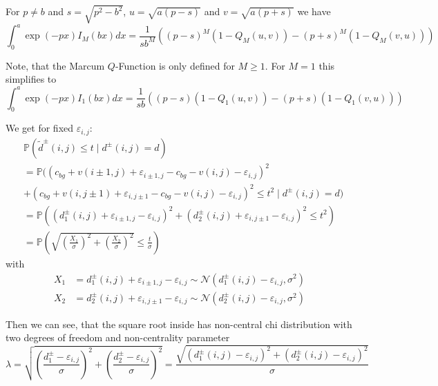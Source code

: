 \documentclass[a4paper,12pt]{article}
\theoremstyle{plain}
\theoremstyle{definition}
\theoremstyle{remark}
\begin{document}
	For $p \neq b$ and $s = \sqrt{p^2 - b^2}$, $u = \sqrt{a (p - s)}$ and $v = \sqrt{a (p + s)}$ we have
	\begin{equation*}
		\int_0^a \exp(-p x) I_M ( b x ) dx = \frac{1}{s b^M} \left( (p - s)^M ( 1 - Q_M(u, v) ) - (p + s)^M ( 1 - Q_M(v, u) ) \right)
	\end{equation*}
	
	Note, that the Marcum $Q$-Function is only defined for $M \geq 1$. For $M = 1$ this simplifies to
	\begin{equation*}
		\int_0^a \exp(-p x) I_1 ( b x ) dx = \frac{1}{s b} \left( (p - s) ( 1 - Q_1(u, v) ) - (p + s) ( 1 - Q_1(v, u) ) \right)
	\end{equation*}
	
	We get for fixed $\varepsilon_{i, j}$:
	\begin{align*}
		&\mathbb{P}(\tilde{d}^\pm(i, j) \leq t \mid d^\pm(i, j) = d) \\
		&= \mathbb{P}( (c_{bg} + v(i \pm 1, j) + \varepsilon_{i \pm 1, j} - c_{bg} - v(i, j) - \varepsilon_{i, j})^2 \\
		&+ (c_{bg} + v(i, j \pm 1) + \varepsilon_{i, j \pm 1} - c_{bg} - v(i, j) - \varepsilon_{i, j})^2 \leq t^2 \mid d^\pm(i, j) = d) \\
		&= \mathbb{P}\left( (d_1^\pm(i, j) + \varepsilon_{i \pm 1, j} - \varepsilon_{i, j})^2 + (d_2^\pm(i, j) + \varepsilon_{i, j \pm 1} - \varepsilon_{i, j})^2 \leq t^2 \right) \\
		&= \mathbb{P}\left( \sqrt{\left( \frac{X_1}{\sigma} \right)^2 + \left( \frac{X_2}{\sigma} \right)^2} \leq \frac{t}{\sigma} \right)
	\end{align*}
	with
	\begin{align*}
		X_1 &= d_1^\pm(i, j) + \varepsilon_{i \pm 1, j} - \varepsilon_{i, j} \sim \mathcal{N}(d_1^\pm(i, j) - \varepsilon_{i, j}, \sigma^2) \\
		X_2 &= d_2^\pm(i, j) + \varepsilon_{i, j \pm 1} - \varepsilon_{i, j} \sim \mathcal{N}(d_2^\pm(i, j) - \varepsilon_{i, j}, \sigma^2)
	\end{align*}
	
	Then we can see, that the square root inside has non-central chi distribution with two degrees of freedom and non-centrality parameter
	\begin{equation*}
		\lambda = \sqrt{\left( \frac{d_1^\pm - \varepsilon_{i, j}}{\sigma} \right)^2 + \left( \frac{d_2^\pm - \varepsilon_{i, j}}{\sigma} \right)^2} = \frac{\sqrt{(d_1^\pm(i, j) - \varepsilon_{i, j})^2 + (d_2^\pm(i, j) - \varepsilon_{i, j})^2}}{\sigma}
	\end{equation*}
	
\end{document}

